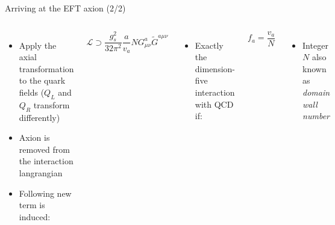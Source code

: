 \documentclass[aspectratio=1610, 9pt]{beamer}
\begin{document}
\begin{frame}{Arriving at the EFT axion (2/2)}
  \begin{columns}
    \column{\textwidth}
    \begin{itemize}
      \item Apply the axial transformation to the quark fields ($Q_L$ and $Q_R$ transform differently)
      \item Axion is removed from the interaction langrangian
      \item Following new term is induced:
    \end{itemize}
    \begin{equation*}
      \mathcal{L} \supset \frac{g_s^2}{32\pi^2} \frac{a}{v_a} N G^a_{\mu\nu} \tilde{G}^{a\mu\nu}
    \end{equation*}
    \begin{itemize}
      \item Exactly the dimension-five interaction with QCD if:
    \end{itemize}
    \begin{equation*}
      f_a = \frac{v_a}{N}
    \end{equation*}
    \begin{itemize}
      \item Integer $N$ also known as \textit{domain wall number}
    \end{itemize}
  \end{columns} 
\end{frame}
\end{document}
